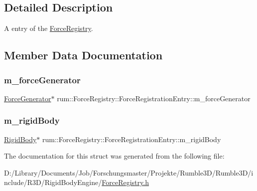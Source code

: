\subsection{Detailed Description}
A entry of the \mbox{\hyperlink{classrum_1_1_force_registry}{Force\+Registry}}. 

\subsection{Member Data Documentation}
\mbox{\label{structrum_1_1_force_registry_1_1_force_registration_entry_ade24f35c350a49149da9a2a0d41af0d5}} 
\subsubsection{\texorpdfstring{m\+\_\+force\+Generator}{m\_forceGenerator}}
{\footnotesize\ttfamily \mbox{\hyperlink{classrum_1_1_force_generator}{Force\+Generator}}$\ast$ rum\+::\+Force\+Registry\+::\+Force\+Registration\+Entry\+::m\+\_\+force\+Generator}

\mbox{\label{structrum_1_1_force_registry_1_1_force_registration_entry_ab9275517ec2525b88a1798b9cfe7df24}} 
\subsubsection{\texorpdfstring{m\+\_\+rigid\+Body}{m\_rigidBody}}
{\footnotesize\ttfamily \mbox{\hyperlink{classrum_1_1_rigid_body}{Rigid\+Body}}$\ast$ rum\+::\+Force\+Registry\+::\+Force\+Registration\+Entry\+::m\+\_\+rigid\+Body}



The documentation for this struct was generated from the following file\+:\begin{DoxyCompactItemize}
\item 
D\+:/\+Library/\+Documents/\+Job/\+Forschungsmaster/\+Projekte/\+Rumble3\+D/\+Rumble3\+D/include/\+R3\+D/\+Rigid\+Body\+Engine/\mbox{\hyperlink{_force_registry_8h}{Force\+Registry.\+h}}\end{DoxyCompactItemize}

